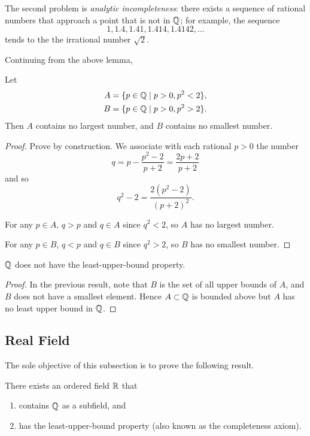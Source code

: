 The second problem is \emph{analytic incompleteness}: there exists a sequence of rational numbers that approach a point that is not in $\mathbb Q$; for example, the sequence
\[1,1.4,1.41,1.414,1.4142,\dots\]
tends to the the irrational number $\sqrt{2}$.

Continuing from the above lemma,
\begin{lemma}
Let
\begin{align*}
A&=\{p\in\mathbb Q\mid p>0,p^2<2\},\\
B&=\{p\in\mathbb Q\mid p>0,p^2>2\}.
\end{align*}
Then $A$ contains no largest number, and $B$ contains no smallest number.
\end{lemma}

\begin{proof}
Prove by construction. We associate with each rational $p>0$ the number
\[q=p-\frac{p^2-2}{p+2}=\frac{2p+2}{p+2}\]
and so
\[q^2-2=\frac{2(p^2-2)}{(p+2)^2}.\]

For any $p\in A$, $q>p$ and $q\in A$ since $q^2<2$, so $A$ has no largest number.

For any $p\in B$, $q<p$ and $q\in B$ since $q^2>2$, so $B$ has no smallest number.
\end{proof}

\begin{proposition}
$\mathbb Q$ does not have the least-upper-bound property.
\end{proposition}

\begin{proof}
In the previous result, note that $B$ is the set of all upper bounds of $A$, and $B$ does not have a smallest element. Hence $A\subset\mathbb Q$ is bounded above but $A$ has no least upper bound in $\mathbb Q$.
\end{proof}

\subsection{Real Field}
The sole objective of this subsection is to prove the following result.

\begin{theorem}\label{thrm:existence-real-field}
There exists an ordered field $\mathbb R$ that
\begin{enumerate}[label=(\roman*)]
\item contains $\mathbb Q$ as a subfield, and
\item has the least-upper-bound property (also known as the completeness axiom).
\end{enumerate}
\end{theorem}

